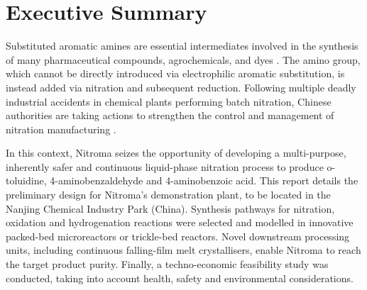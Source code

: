 \section*{Executive Summary}
\label{sec:exec-summary}

Substituted aromatic amines are essential intermediates involved in the synthesis of many pharmaceutical compounds, agrochemicals, and dyes \cite{vogt_amines_2000}. The amino group, which cannot be directly introduced via electrophilic aromatic substitution, is instead added via nitration and subsequent reduction. Following multiple deadly industrial accidents in chemical plants performing batch nitration, Chinese authorities are taking actions to strengthen the control and management of nitration manufacturing \cite{el_diario_china_2019}.

In this context, Nitroma seizes the opportunity of developing a multi-purpose, inherently safer and continuous liquid-phase nitration process to produce o-toluidine, 4-aminobenzaldehyde and 4-aminobenzoic acid. This report details the preliminary design for Nitroma’s demonstration plant, to be located in the Nanjing Chemical Industry Park (China). Synthesis pathways for nitration, oxidation and hydrogenation reactions were selected and modelled in innovative packed-bed microreactors or trickle-bed reactors. Novel downstream processing units, including continuous falling-film melt crystallisers, enable Nitroma to reach the target product purity. Finally, a techno-economic feasibility study was conducted, taking into account health, safety and environmental considerations.
